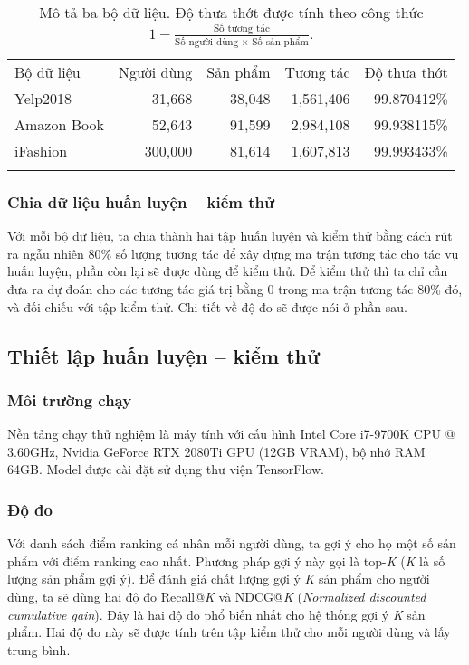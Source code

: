 \begin{table}[H]
    \centering
    \renewcommand{\arraystretch}{1.1}
    \begin{tabular}{l|r|r|r|r}
        \hhline{-----}
        Bộ dữ liệu  & Người dùng & Sản phẩm & Tương tác & Độ thưa thớt \\
        \hhline{=====}
        Yelp2018    & 31,668 & 38,048 & 1,561,406 & 99.870412\% \\
        Amazon Book & 52,643 & 91,599 & 2,984,108 & 99.938115\% \\
        iFashion    & 300,000 & 81,614 & 1,607,813 & 99.993433\% \\
        \hhline{-----}
    \end{tabular}
    \caption[Mô tả ba bộ dữ liệu.]{Mô tả ba bộ dữ liệu. Độ thưa thớt được tính theo công thức $1 - \frac{\text{Số tương tác}}{\text{Số người dùng} \; \times \; \text{Số sản phẩm}}$.}
\end{table}

\subsubsection{Chia dữ liệu huấn luyện -- kiểm thử}
\noindent Với mỗi bộ dữ liệu, ta chia thành hai tập huấn luyện và kiểm thử bằng cách rút ra ngẫu nhiên 80\% số lượng tương tác để xây dựng ma trận tương tác cho tác vụ huấn luyện, phần còn lại sẽ được dùng để kiểm thử. Để kiểm thử thì ta chỉ cần đưa ra dự đoán cho các tương tác giá trị bằng 0 trong ma trận tương tác 80\% đó, và đối chiếu với tập kiểm thử. Chi tiết về độ đo sẽ được nói ở phần sau.

\subsection{Thiết lập huấn luyện -- kiểm thử}

\subsubsection{Môi trường chạy}
\noindent Nền tảng chạy thử nghiệm là máy tính với cấu hình Intel Core i7-9700K CPU @ 3.60GHz, Nvidia GeForce RTX 2080Ti GPU (12GB VRAM), bộ nhớ RAM 64GB. Model được cài đặt sử dụng thư viện TensorFlow.

\subsubsection{Độ đo}
\noindent Với danh sách điểm ranking cá nhân mỗi người dùng, ta gợi ý cho họ một số sản phẩm với điểm ranking cao nhất. Phương pháp gợi ý này gọi là top-\textit{K} \cite{generic-top-N} (\textit{K} là số lượng sản phẩm gợi ý). Để đánh giá chất lượng gợi ý \textit{K} sản phẩm cho người dùng, ta sẽ dùng hai độ đo Recall@\textit{K} và NDCG@\textit{K} (\textit{Normalized discounted cumulative gain}). Đây là hai độ đo phổ biến nhất cho hệ thống gợi ý \textit{K} sản phẩm. Hai độ đo này sẽ được tính trên tập kiểm thử cho mỗi người dùng và lấy trung bình.

